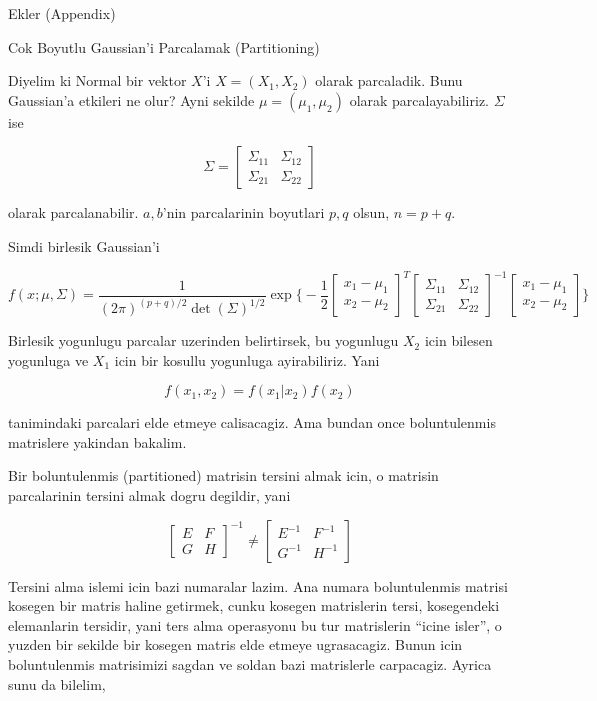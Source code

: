 \documentclass[12pt,fleqn]{article}\usepackage{../common}
\begin{document}
Ekler (Appendix) 

Cok Boyutlu Gaussian'i Parcalamak (Partitioning)

Diyelim ki Normal bir vektor $X$'i $X = (X_1,X_2)$ olarak parcaladik. Bunu
Gaussian'a etkileri ne olur? Ayni sekilde $\mu = (\mu_1,\mu_2)$ olarak
parcalayabiliriz. $\Sigma$ ise

\[ \Sigma = 
\left[\begin{array}{rr}
\Sigma_{11} & \Sigma_{12}\\
\Sigma_{21} & \Sigma_{22}
\end{array}\right]
 \]

olarak parcalanabilir. $a,b$'nin parcalarinin boyutlari $p,q$ olsun, $n =
p+q$.

Simdi birlesik Gaussian'i 

\[ f(x;\mu,\Sigma) = 
\frac{ 1}{(2\pi)^{(p+q)/2} \det(\Sigma)^{1/2}} 
\exp 
\bigg\{ 
-\frac{ 1}{2}
\left[\begin{array}{r}
x_1 - \mu_1\\
x_2 - \mu_2
\end{array}\right]^T
\left[\begin{array}{rr}
\Sigma_{11} & \Sigma_{12}\\
\Sigma_{21} & \Sigma_{22}
\end{array}\right]^{-1}
\left[\begin{array}{r}
x_1 - \mu_1\\
x_2 - \mu_2
\end{array}\right]
\bigg\}
 \]

Birlesik yogunlugu parcalar uzerinden belirtirsek, bu yogunlugu $X_2$ icin
bilesen yogunluga ve $X_1$ icin bir kosullu yogunluga ayirabiliriz. Yani 

\[ f(x_1,x_2) = f(x_1|x_2) f(x_2) \]

tanimindaki parcalari elde etmeye calisacagiz.  Ama bundan once
boluntulenmis matrislere yakindan bakalim. 

Bir boluntulenmis (partitioned) matrisin tersini almak icin, o matrisin
parcalarinin tersini almak dogru degildir, yani

\[ 
\left[\begin{array}{rr}
E & F \\
G & H
\end{array}\right] ^{-1} \ne
\left[\begin{array}{rr}
E^{-1} & F ^{-1}\\
G^{-1} & H^{-1}
\end{array}\right]  
 \]

Tersini alma islemi icin bazi numaralar lazim. Ana numara boluntulenmis matrisi 
kosegen bir matris haline getirmek, cunku kosegen matrislerin tersi,
kosegendeki elemanlarin tersidir, yani ters alma operasyonu bu tur
matrislerin ``icine isler'', o yuzden bir sekilde bir kosegen matris
elde etmeye ugrasacagiz. Bunun icin boluntulenmis matrisimizi sagdan ve
soldan bazi matrislerle carpacagiz. Ayrica sunu da bilelim, 
\end{document}
